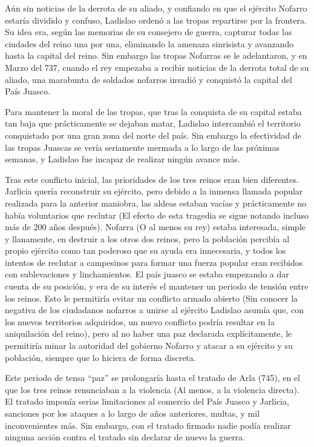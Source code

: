 \par 
Aún sin noticias de la derrota de su aliado, y confiando en que el ejército Nofarro estaría dividido y confuso, Ladislao ordenó a las tropas repartirse por la frontera. Su idea era, según las memorias de su consejero de guerra, capturar todas las ciudades del reino una por una, eliminando la amenaza sinrisista y avanzando hasta la capital del reino. Sin embargo las tropas Nofarras se le adelantaron, y en Marzo del 737, cuando el rey empezaba a recibir noticias de la derrota total de su aliado, una marabunta de soldados nofarros invadió y conquistó la capital del País Juasco. 
\par 
Para mantener la moral de las tropas, que tras la conquista de su capital estaba tan baja que prácticamente se dejaban matar, Ladislao intercambió el territorio conquistado por una gran zona del norte del país. Sin embargo la efectividad de las tropas Juascas se vería seriamente mermada a lo largo de las próximas semanas, y Ladislao fue incapaz de realizar ningún avance más.
\par 
Tras este conflicto inicial, las prioridades de los tres reinos eran bien diferentes. Jarlicia quería reconstruir su ejército, pero debido a la inmensa llamada popular realizada para la anterior maniobra, las aldeas estaban vacías y prácticamente no había voluntarios que reclutar (El efecto de esta tragedia se sigue notando incluso más de 200 años después). Nofarra (O al menos su rey) estaba interesada, simple y llanamente, en destruir a los otros dos reinos, pero la población percibía al propio ejército como tan poderoso que su ayuda era innecesaria, y todos los intentos de reclutar a campesinos para formar una fuerza popular eran recibidos con sublevaciones y linchamientos. El país juasco se estaba empezando a dar cuenta de su posición, y era de su interés el mantener un periodo de tensión entre los reinos. Esto le permitiría evitar un conflicto armado abierto (Sin conocer la negativa de los ciudadanos nofarros a unirse al ejército Ladislao asumía que, con los nuevos territorios adquiridos, un nuevo conflicto podría resultar en la aniquilación del reino), pero al no haber una paz declarada explícitamente, le permitiría minar la autoridad del gobierno Nofarro y atacar a su ejército y su población, siempre que lo hiciera de forma discreta. 
\par 
Este periodo de tensa ``paz'' se prolongaría hasta el tratado de Arla (745), en el que los tres reinos renunciaban a la violencia (Al menos, a la violencia directa). El tratado imponía serias limitaciones al comercio del País Juasco y Jarlicia, sanciones por los ataques a lo largo de años anteriores, multas, y mil inconvenientes más. Sin embargo, con el tratado firmado nadie podía realizar ninguna acción contra el tratado sin declarar de nuevo la guerra.

